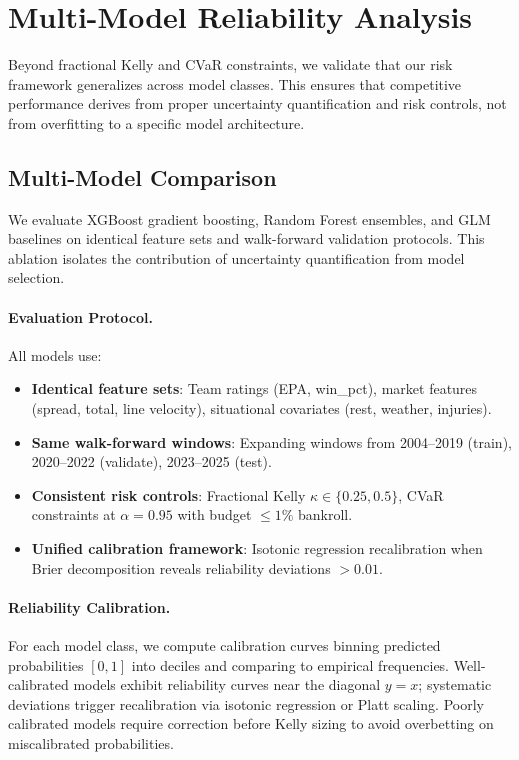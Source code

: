 \section{Multi-Model Reliability Analysis}\label{sec:multi-model-reliability}
Beyond fractional Kelly and CVaR constraints, we validate that our risk framework generalizes across model classes. This ensures that competitive performance derives from proper uncertainty quantification and risk controls, not from overfitting to a specific model architecture.

\subsection{Multi-Model Comparison}\label{subsec:multi-model-comparison}
We evaluate XGBoost gradient boosting, Random Forest ensembles, and GLM baselines on identical feature sets and walk-forward validation protocols. This ablation isolates the contribution of uncertainty quantification from model selection.

\paragraph{Evaluation Protocol.}
All models use:
\begin{itemize}
  \item \textbf{Identical feature sets}: Team ratings (EPA, win\_pct), market features (spread, total, line velocity), situational covariates (rest, weather, injuries).
  \item \textbf{Same walk-forward windows}: Expanding windows from 2004--2019 (train), 2020--2022 (validate), 2023--2025 (test).
  \item \textbf{Consistent risk controls}: Fractional Kelly $\kappa \in \{0.25, 0.5\}$, CVaR constraints at $\alpha=0.95$ with budget $\le 1\%$ bankroll.
  \item \textbf{Unified calibration framework}: Isotonic regression recalibration when Brier decomposition reveals reliability deviations $>0.01$.
\end{itemize}

\paragraph{Reliability Calibration.}
For each model class, we compute calibration curves binning predicted probabilities $[0,1]$ into deciles and comparing to empirical frequencies. Well-calibrated models exhibit reliability curves near the diagonal $y=x$; systematic deviations trigger recalibration via isotonic regression or Platt scaling. Poorly calibrated models require correction before Kelly sizing to avoid overbetting on miscalibrated probabilities.

